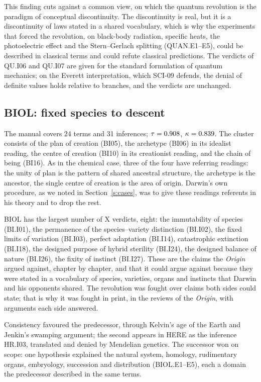 \documentclass{situationist-preprint}
\begin{document}
This finding cuts against a common view, on which the quantum revolution is the paradigm of conceptual discontinuity. The discontinuity is real, but it is a discontinuity of laws stated in a shared vocabulary, which is why the experiments that forced the revolution, on black-body radiation, specific heats, the photoelectric effect and the Stern--Gerlach splitting (QUAN.E1--E5), could be described in classical terms and could refute classical predictions. The verdicts of QU.I06 and QU.I07 are given for the standard formulation of quantum mechanics; on the Everett interpretation, which SCI-09 defends, the denial of definite values holds relative to branches, and the verdicts are unchanged.

\subsection{BIOL: fixed species to descent}

The manual covers 24 terms and 31 inferences; $\tau = 0.908$, $\kappa = 0.839$. The cluster consists of the plan of creation (BI05), the archetype (BI06) in its idealist reading, the centre of creation (BI10) in its creationist reading, and the chain of being (BI16). As in the chemical case, three of the four have referring readings: the unity of plan is the pattern of shared ancestral structure, the archetype is the ancestor, the single centre of creation is the area of origin. Darwin's own procedure, as we noted in Section~\ref{s:cases}, was to give these readings referents in his theory and to drop the rest.

BIOL has the largest number of X verdicts, eight: the immutability of species (BI.I01), the permanence of the species--variety distinction (BI.I02), the fixed limits of variation (BI.I03), perfect adaptation (BI.I14), catastrophic extinction (BI.I18), the designed purpose of hybrid sterility (BI.I24), the designed balance of nature (BI.I26), the fixity of instinct (BI.I27). These are the claims the \emph{Origin} argued against, chapter by chapter, and that it could argue against because they were stated in a vocabulary of species, varieties, organs and instincts that Darwin and his opponents shared. The revolution was fought over claims both sides could state; that is why it was fought in print, in the reviews of the \emph{Origin}, with arguments each side answered.

Consistency favoured the predecessor, through Kelvin's age of the Earth and Jenkin's swamping argument; the second appears in HERE as the inference HR.I03, translated and denied by Mendelian genetics. The successor won on scope: one hypothesis explained the natural system, homology, rudimentary organs, embryology, succession and distribution (BIOL.E1--E5), each a domain the predecessor described in the same terms.
\end{document}

